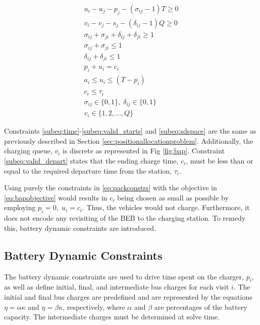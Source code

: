 \documentclass[letterpaper, 10pt, conference]{IEEEtran}
\begin{document}
\begin{subequations}
\label{eq:packconstrs}
\begin{align}
    u_i - u_j - p_j - (\sigma_{ij} - 1)T \geq 0                      \label{subeq:time}         \\
    v_i - v_j - s_j - (\delta_{ij} - 1)Q \geq 0                      \label{subeq:space}        \\
    \sigma_{ij} + \sigma_{ji} + \delta_{ij} + \delta_{ji} \geq 1     \label{subeq:valid_pos}    \\
    \sigma_{ij} + \sigma_{ji} \leq 1                                 \label{subeq:sigma}        \\
    \delta_{ij} + \delta_{ji} \leq 1                                 \label{subeq:delta}        \\
    p_i + u_i = c_i                                                  \label{subeq:detach}       \\
    a_i \leq u_i \leq (T - p_i)                                      \label{subeq:valid_starts} \\
    c_i \leq \tau_i                                                  \label{subeq:valid_depart} \\
    \sigma_{ij} \in \{0,1\},\;\delta_{ij} \in \{0,1\}                \label{subeq:sdspace}      \\
    v_i \in \{1,2, ... , Q\}                                         \label{subeq:vspace}
\end{align}
\end{subequations}

Constraints \eqref{subeq:time}-\eqref{subeq:valid_starts} and \eqref{subeq:sdspace} are the same as previously described in Section \ref{sec:positionallocationproblem}. Additionally, the charging queue, \(v_i\) is discrete as represented in Fig \ref{fig:bap}. Constraint \eqref{subeq:valid_depart} states that the ending charge time, \(c_i\), must be less than or equal to the required departure time from the station, \(\tau_i\).

Using purely the constraints in \eqref{eq:packconstrs} with the objective in \eqref{eq:bapobjective} would results in \(c_i\) being chosen as small as possible by employing \(p_i = 0,\; u_i = c_i\). Thus, the vehicles would not charge. Furthermore, it does not encode any revisiting of the BEB to the charging station. To remedy this, battery dynamic constraints are introduced.

\subsection{Battery Dynamic Constraints}
The battery dynamic constraints are used to drive time spent on the charger, \(p_i\), as well as define initial, final, and intermediate bus charges for each visit \(i\). The initial and final bus charges are predefined and are represented by the equations \(\eta = \alpha \kappa\) and \(\eta = \beta \kappa\), respectively, where \(\alpha\) and \(\beta\) are percentages of the battery capacity. The intermediate charges must be determined at solve time.
\end{document}
